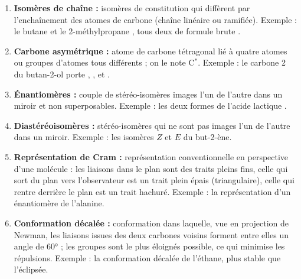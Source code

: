 \documentclass[11pt]{article}
\begin{document}
\begin{corrige}
\begin{enumerate}
\item \textbf{Isomères de chaîne :} isomères de constitution qui diffèrent par l'enchaînement des atomes de carbone (chaîne linéaire ou ramifiée). Exemple : le butane  et le 2-méthylpropane , tous deux de formule brute .
\item \textbf{Carbone asymétrique :} atome de carbone tétragonal lié à quatre atomes ou groupes d'atomes tous différents ; on le note C$^*$. Exemple : le carbone 2 du butan-2-ol  porte , ,  et .
\item \textbf{Énantiomères :} couple de stéréo-isomères images l'un de l'autre dans un miroir et non superposables. Exemple : les deux formes de l'acide lactique .
\item \textbf{Diastéréoisomères :} stéréo-isomères qui ne sont pas images l'un de l'autre dans un miroir. Exemple : les isomères $Z$ et $E$ du but-2-ène.
\item \textbf{Représentation de Cram :} représentation conventionnelle en perspective d'une molécule : les liaisons dans le plan sont des traits pleins fins, celle qui sort du plan vers l'observateur est un trait plein épais (triangulaire), celle qui rentre derrière le plan est un trait hachuré. Exemple : la représentation d'un énantiomère de l'alanine.
\item \textbf{Conformation décalée :} conformation dans laquelle, vue en projection de Newman, les liaisons issues des deux carbones voisins forment entre elles un angle de \ang{60} ; les groupes sont le plus éloignés possible, ce qui minimise les répulsions. Exemple : la conformation décalée de l'éthane, plus stable que l'éclipsée.
\end{enumerate}
\end{corrige}
\end{document}

